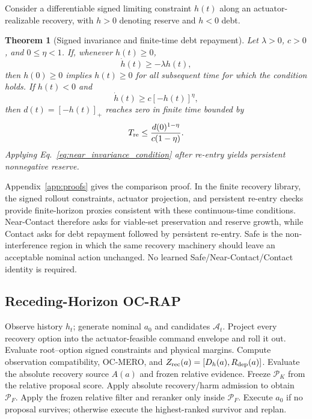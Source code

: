 \documentclass{article} %
\newcommand{\cA}{\mathcal{A}}
\newcommand{\cP}{\mathcal{P}}
\newcommand{\Rdep}{R_{\mathrm{dep}}}
\newtheorem{theorem}{Theorem}
\begin{document}
Consider a differentiable signed limiting constraint $h(t)$ along an actuator-realizable recovery, with $h>0$ denoting reserve and $h<0$ debt.
\begin{theorem}[Signed invariance and finite-time debt repayment]
\label{thm:signed_viability}
Let $\lambda>0$, $c>0$, and $0\le\eta<1$. If, whenever $h(t)\ge0$,
\begin{equation}
 \dot h(t)\ge-\lambda h(t),
 \label{eq:near_invariance_condition}
\end{equation}
then $h(0)\ge0$ implies $h(t)\ge0$ for all subsequent time for which the condition holds. If $h(t)<0$ and
\begin{equation}
 \dot h(t)\ge c[-h(t)]^\eta,
 \label{eq:contact_debt_condition}
\end{equation}
then $d(t)=[-h(t)]_+$ reaches zero in finite time bounded by
\begin{equation}
 T_{\rm re}\le\frac{d(0)^{1-\eta}}{c(1-\eta)}.
 \label{eq:finite_reentry_bound}
\end{equation}
Applying Eq.~\eqref{eq:near_invariance_condition} after re-entry yields persistent nonnegative reserve.
\end{theorem}
Appendix~\ref{app:proofs} gives the comparison proof. In the finite recovery library, the signed rollout constraints, actuator projection, and persistent re-entry checks provide finite-horizon proxies consistent with these continuous-time conditions. Near-Contact therefore asks for viable-set preservation and reserve growth, while Contact asks for debt repayment followed by persistent re-entry. Safe is the non-interference region in which the same recovery machinery should leave an acceptable nominal action unchanged. No learned Safe/Near-Contact/Contact identity is required.

\subsection{Receding-Horizon OC-RAP}
\label{subsec:runtime_algorithm}

\begin{algorithm}[t]
\caption{OC-RAP with observation-consistent recovery and RIFA}
\label{alg:ocrap}
\begin{algorithmic}[1]
\STATE Observe history $h_t$; generate nominal $a_0$ and candidates $\cA_t$.
\FOR{each candidate $a\in\cA_t$}
    \STATE Project every recovery option into the actuator-feasible command envelope and roll it out.
    \STATE Evaluate root--option signed constraints and physical margins.
    \STATE Compute observation compatibility, OC-MERO, and $Z_{\rm rec}(a)=[D_h(a),\Rdep(a)]$.
    \STATE Evaluate the absolute recovery source $A(a)$ and frozen relative evidence.
\ENDFOR
\STATE Freeze $\cP_K$ from the relative proposal score.
\STATE Apply absolute recovery/harm admission to obtain $\cP_F$.
\STATE Apply the frozen relative filter and reranker only inside $\cP_F$.
\STATE Execute $a_0$ if no proposal survives; otherwise execute the highest-ranked survivor and replan.
\end{algorithmic}
\end{algorithm}
\end{document}
